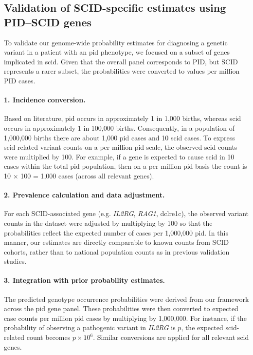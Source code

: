 \subsection{Validation of SCID-specific estimates using PID–SCID genes}

To validate our genome-wide probability estimates for diagnosing a genetic variant in a patient with an \ac{pid} phenotype, we focused on a subset of genes implicated in \ac{scid}. Given that the overall panel corresponds to PID, but SCID represents a rarer subset, the probabilities were converted to values per million PID cases.

\paragraph{1. Incidence conversion.}
Based on literature, \ac{pid} occurs in approximately 1 in 1,000 births, whereas \ac{scid} occurs in approximately 1 in 100,000 births. 
Consequently, in a population of 1,000,000 births there are about 1,000 \ac{pid} cases and 10 \ac{scid} cases. 
To express \ac{scid}-related variant counts on a per-million \ac{pid}  scale, the observed \ac{scid} counts were multiplied by 100. 
For example, if a gene is expected to cause \ac{scid} in 10 cases within the total \ac{pid} population, then on a per-million \ac{pid}  basis the count is 10 × 100 = 1,000 cases (across all relevant genes).

\paragraph{2. Prevalence calculation and data adjustment.}
For each SCID-associated gene (e.g. \textit{IL2RG}, \textit{RAG1}, \ac{dclre1c}), the observed variant counts in the dataset were adjusted by multiplying by 100 so that the probabilities reflect the expected number of cases per 1,000,000 \ac{pid}. 
In this manner, our estimates are directly comparable to known counts from SCID cohorts, rather than to national population counts as in previous validation studies.

\paragraph{3. Integration with prior probability estimates.}
The predicted genotype occurrence probabilities were derived from our framework across the \ac{pid} gene panel. 
These probabilities were then converted to expected case counts per million  \ac{pid} cases by multiplying by 1,000,000. 
For instance, if the probability of observing a pathogenic variant in \textit{IL2RG} is \(p\), the expected \ac{scid}-related count becomes \(p \times 10^6\). Similar conversions are applied for all relevant \ac{scid} genes.

